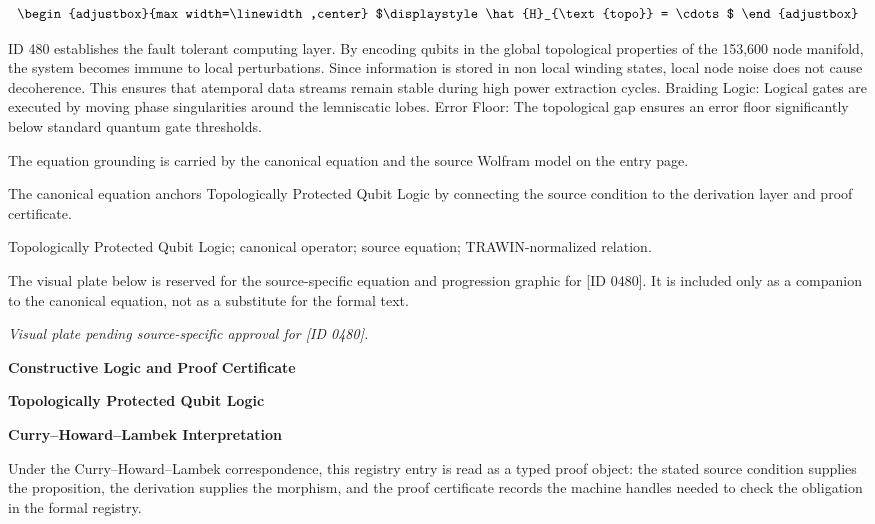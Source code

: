 \[
\begin{adjustbox}{max width=\linewidth,center}
$\displaystyle
\hat{H}_{\text{topo}} = \cdots
$
\end{adjustbox}
\]

ID 480 establishes the fault tolerant computing layer. By encoding qubits in the global topological properties of the 153,600 node manifold, the system becomes immune to local perturbations. Since information is stored in non local winding states, local node noise does not cause decoherence. This ensures that atemporal data streams remain stable during high power extraction cycles. Braiding Logic: Logical gates are executed by moving phase singularities around the lemniscatic lobes. Error Floor: The topological gap ensures an error floor significantly below standard quantum gate thresholds.

The equation grounding is carried by the canonical equation and the source Wolfram model on the entry page.

The canonical equation anchors Topologically Protected Qubit Logic by connecting the source condition to the derivation layer and proof certificate.

Topologically Protected Qubit Logic; canonical operator; source equation; TRAWIN-normalized relation.
\endgroup

\begingroup\footnotesize\sloppy
The visual plate below is reserved for the source-specific equation and progression graphic for [ID 0480]. It is included only as a companion to the canonical equation, not as a substitute for the formal text.
\par\endgroup
\begingroup\footnotesize\itshape
Visual plate pending source-specific approval for [ID 0480].
\par\endgroup

\clearpage
\begingroup\tzpsupportsetup
\noindent\textbf{\fontsize{10.8pt}{12.8pt}\selectfont [ID 0480] Constructive Logic and Proof Certificate}\par
\noindent\textbf{\fontsize{10pt}{12pt}\selectfont Topologically Protected Qubit Logic}\par
\vspace{0.45em}
\begingroup
\footnotesize
\setlength{\parskip}{0.22em}
\setlength{\parindent}{0pt}
\noindent\textbf{Curry--Howard--Lambek Interpretation}\par
Under the Curry--Howard--Lambek correspondence, this registry entry is read as a typed proof
object: the stated source condition supplies the proposition, the derivation supplies the
morphism, and the proof certificate records the machine handles needed to check the obligation
in the formal registry.

